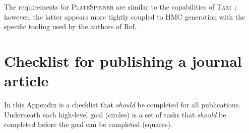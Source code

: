 \documentclass{article}
\newcommand\rfcword[1]{\emph{#1}\xspace}
\newcommand\should{\rfcword{should}}
\newcommand\program[1]{\textsc{#1}\xspace}
\begin{document}
The requirements for \program{PlateSpinner} are similar to the capabilities of \program{Taxi}~\cite{Ayyar:2018wwf};
however,
the latter appears more tightly coupled to HMC generation with
the specific tooling used by the authors of Ref.~\cite{Ayyar:2018wwf}.



\nocite{apsrev41Control}


\clearpage
\appendix

\section{Checklist for publishing a journal article}

In this Appendix is a checklist that \should be completed for all publications.
Underneath each high-level goal
(circles)
is a set of tasks that \should be completed before the goal can be completed
(squares).
\end{document}
